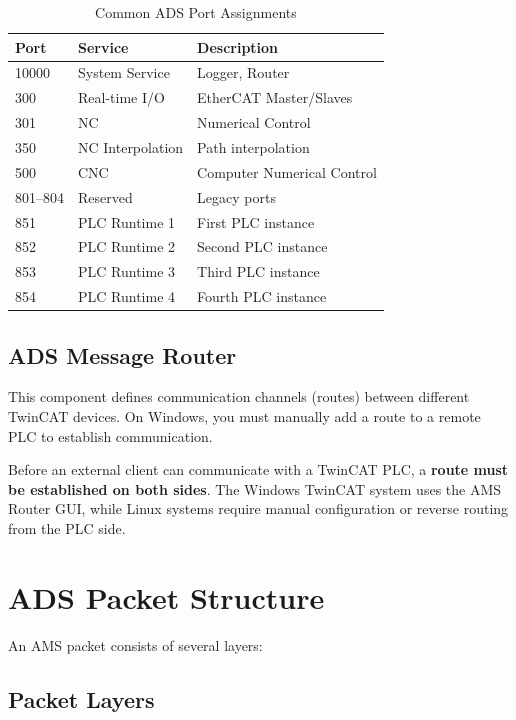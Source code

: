 \documentclass[11pt,a4paper]{article}
\begin{document}
\begin{table}[h]
\centering
\begin{tabular}{@{}lll@{}}
\toprule
\textbf{Port} & \textbf{Service} & \textbf{Description} \\
\midrule
10000 & System Service & Logger, Router \\
300 & Real-time I/O & EtherCAT Master/Slaves \\
301 & NC & Numerical Control \\
350 & NC Interpolation & Path interpolation \\
500 & CNC & Computer Numerical Control \\
801--804 & Reserved & Legacy ports \\
851 & PLC Runtime 1 & First PLC instance \\
852 & PLC Runtime 2 & Second PLC instance \\
853 & PLC Runtime 3 & Third PLC instance \\
854 & PLC Runtime 4 & Fourth PLC instance \\
\bottomrule
\end{tabular}
\caption{Common ADS Port Assignments}
\end{table}

\subsection{ADS Message Router}

This component defines communication channels (routes) between different TwinCAT devices. On Windows, you must manually add a route to a remote PLC to establish communication.

\begin{warningbox}
Before an external client can communicate with a TwinCAT PLC, a \textbf{route must be established on both sides}. The Windows TwinCAT system uses the AMS Router GUI, while Linux systems require manual configuration or reverse routing from the PLC side.
\end{warningbox}

\section{ADS Packet Structure}

An AMS packet consists of several layers:

\subsection{Packet Layers}
\end{document}
